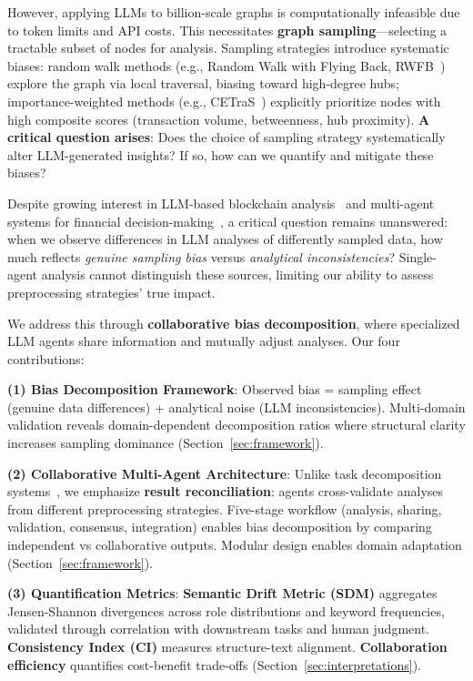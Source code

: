 \documentclass[conference]{IEEEtran}
\begin{document}
However, applying LLMs to billion-scale graphs is computationally infeasible due to token limits and API costs. This necessitates \textbf{graph sampling}---selecting a tractable subset of nodes for analysis. Sampling strategies introduce systematic biases: random walk methods (e.g., Random Walk with Flying Back, RWFB~\cite{leskovec2006sampling}) explore the graph via local traversal, biasing toward high-degree hubs; importance-weighted methods (e.g., CETraS~\cite{lei2025llm}) explicitly prioritize nodes with high composite scores (transaction volume, betweenness, hub proximity). \textbf{A critical question arises}: Does the choice of sampling strategy systematically alter LLM-generated insights? If so, how can we quantify and mitigate these biases?

Despite growing interest in LLM-based blockchain analysis~\cite{lei2025llm,chen2024llm,wang2024crypto} and multi-agent systems for financial decision-making~\cite{li2024multiagent,qian2023communicative}, a critical question remains unanswered: when we observe differences in LLM analyses of differently sampled data, how much reflects \textit{genuine sampling bias} versus \textit{analytical inconsistencies}? Single-agent analysis cannot distinguish these sources, limiting our ability to assess preprocessing strategies' true impact.

We address this through \textbf{collaborative bias decomposition}, where specialized LLM agents share information and mutually adjust analyses. Our four contributions:

\textbf{(1) Bias Decomposition Framework}: Observed bias = sampling effect (genuine data differences) + analytical noise (LLM inconsistencies). Multi-domain validation reveals domain-dependent decomposition ratios where structural clarity increases sampling dominance (Section~\ref{sec:framework}).

\textbf{(2) Collaborative Multi-Agent Architecture}: Unlike task decomposition systems~\cite{qian2023communicative}, we emphasize \textbf{result reconciliation}: agents cross-validate analyses from different preprocessing strategies. Five-stage workflow (analysis, sharing, validation, consensus, integration) enables bias decomposition by comparing independent vs collaborative outputs. Modular design enables domain adaptation (Section~\ref{sec:framework}).

\textbf{(3) Quantification Metrics}: \textbf{Semantic Drift Metric (SDM)} aggregates Jensen-Shannon divergences across role distributions and keyword frequencies, validated through correlation with downstream tasks and human judgment. \textbf{Consistency Index (CI)} measures structure-text alignment. \textbf{Collaboration efficiency} quantifies cost-benefit trade-offs (Section~\ref{sec:interpretations}).
\end{document}
